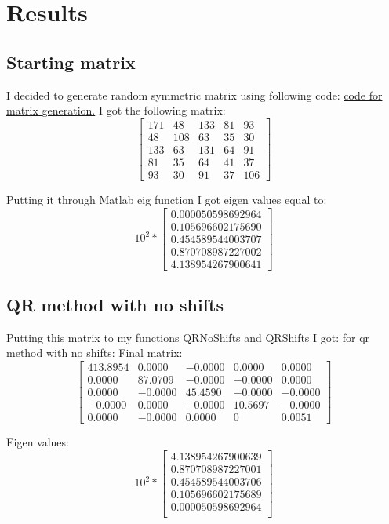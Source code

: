 \section{Results}
\subsection{Starting matrix}
I decided to generate random symmetric matrix using following code:
\hyperlink{function4_matrix_generation}{code for matrix generation.}
I got the following matrix:
\[
\begin{bmatrix}
171  &  48  & 133  &  81  &  93 \\
 48  & 108  &  63  &  35  &  30 \\
133  &  63  & 131  &  64  &  91 \\
 81  &  35  &  64  &  41  &  37 \\
 93  &  30  &  91  &  37  & 106
\end{bmatrix}
\]

Putting it through Matlab eig function I got eigen values equal to:
\[
10^{2} *
\begin{bmatrix}
  0.000050598692964 \\
  0.105696602175690 \\
  0.454589544003707 \\
  0.870708987227002 \\
  4.138954267900641
\end{bmatrix}
\]

\newpage
\subsection{QR method with no shifts}
Putting this matrix to my functions QRNoShifts and QRShifts I got:
for qr method with no shifts:
Final matrix:
\[
\begin{bmatrix}
413.8954  &  0.0000  & -0.0000  &  0.0000  &  0.0000 \\
 0.0000  & 87.0709  &  -0.0000  &  -0.0000  &  0.0000 \\
0.0000  &  -0.0000  & 45.4590  &  -0.0000  &  -0.0000 \\
 -0.0000  &  0.0000  &  -0.0000  &  10.5697  &  -0.0000 \\
 0.0000  &  -0.0000  &  0.0000  &  0  & 0.0051
\end{bmatrix}
\]

Eigen values:
\[
10^{2} *
\begin{bmatrix}
  4.138954267900639 \\
   0.870708987227001 \\
   0.454589544003706 \\
   0.105696602175689 \\
   0.000050598692964 \\
\end{bmatrix}
\]

